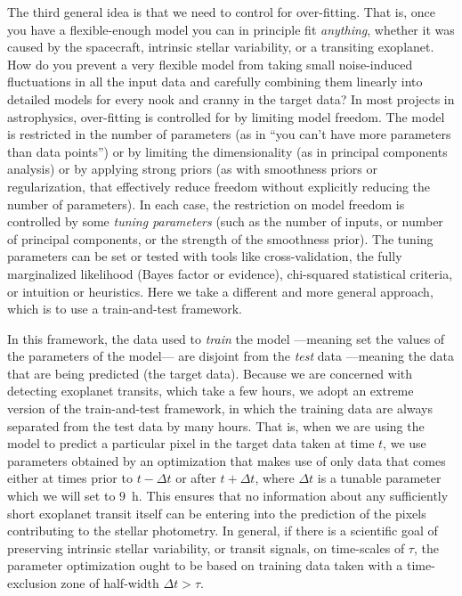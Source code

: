 The third general idea is that we need to control for over-fitting.
That is, once you have a flexible-enough model you can in principle fit \emph{anything},
  whether it was caused by the spacecraft, intrinsic stellar variability, or a transiting exoplanet.
How do you prevent a very flexible model from taking small noise-induced fluctuations in all the input data
  and carefully combining them linearly into detailed models for every nook and cranny in the target data?
In most projects in astrophysics, over-fitting is controlled for by limiting model freedom.
The model is restricted in the number of parameters
  (as in ``you can't have more parameters than data points'')
  or by limiting the dimensionality
  (as in principal components analysis)
  or by applying strong priors
  (as with smoothness priors or regularization, 
  that effectively reduce freedom without explicitly reducing the number of parameters).
In each case, the restriction on model freedom is controlled by some \emph{tuning parameters}
  (such as the number of inputs, or number of principal components, or the strength of the smoothness prior).
The tuning parameters can be set or tested with tools like cross-validation,
  the fully marginalized likelihood (Bayes factor or evidence),
  chi-squared statistical criteria,
  or intuition or heuristics.
Here we take a different and more general approach, which is to use a train-and-test framework.

In this framework, the data used to \emph{train} the model%
  ---meaning set the values of the parameters of the model---%
  are disjoint from the \emph{test} data
  ---meaning the data that are being predicted (the target data).
Because we are concerned with detecting exoplanet transits,
  which take a few hours,
  we adopt an extreme version of the train-and-test framework,
  in which the training data are always separated from the test data by many hours.
That is, when we are using the model to predict a particular pixel in the target data taken at time $t$,
  we use parameters obtained by an optimization that makes use of only data
  that comes either at times prior to $t-\Delta t$ or after $t+\Delta t$,
  where $\Delta t$ is a tunable parameter which we will set to $9$~h.
This ensures that no information about any sufficiently short exoplanet transit itself
  can be entering into the prediction of the pixels contributing to the stellar photometry.
In general, if there is a scientific goal of preserving intrinsic stellar variability,
  or transit signals,
  on time-scales of $\tau$,
  the parameter optimization ought to be based on training data taken with a time-exclusion zone of half-width $\Delta t > \tau$.

